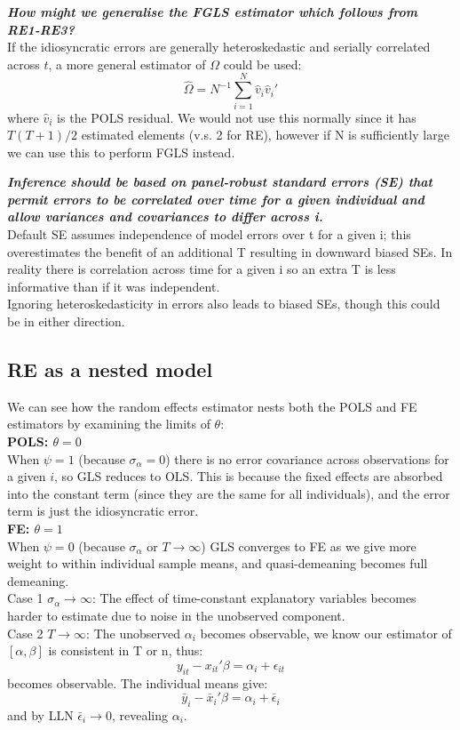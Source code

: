 \documentclass[DIV=14,titlepage=false]{scrreprt}
\begin{document}
\begin{explanation}
    \textit{\textbf{How might we generalise the FGLS estimator which follows from RE1-RE3?}}\\
    If the idiosyncratic errors are generally heteroskedastic and serially correlated across $t$, a more general estimator of $\Omega$ could be used: \[
        \hat \Omega = N^{-1}\sum_{i=1}^N \hat v_i \hat v_i'
    \]
    where $\hat v_i$ is the POLS residual. We would not use this normally since it has $T(T+1)/2$ estimated elements (v.s. 2 for RE), however if N is sufficiently large we can use this to perform FGLS instead.
    \end{explanation}
    \begin{explanation}
        \textit{\textbf{Inference should be based on panel-robust standard errors (SE) that permit errors to be correlated over time for a given individual and allow variances and covariances to differ across i.}}\\
        Default SE assumes independence of model errors over t for a given i; this overestimates the benefit of an additional T resulting in downward biased SEs. In reality there is correlation across time for a given i so an extra T is less informative than if it was independent.\\
        Ignoring heteroskedasticity in errors also leads to biased SEs, though this could be in either direction.
        \end{explanation}
\subsection{RE as a nested model}
We can see how the random effects estimator nests both the POLS and FE estimators by examining the limits of $\theta$:\\
\textbf{POLS: $\theta = 0$}\\
When $\psi = 1$ (because $\sigma_{\alpha} = 0$) there is no error covariance across observations for a given $i$, so GLS reduces to OLS. This is because the fixed effects are absorbed into the constant term (since they are the same for all individuals), and the error term is just the idiosyncratic error.\\
\textbf{FE: $\theta = 1$}\\
When $\psi = 0$ (because $\sigma_\alpha$ or $T \to \infty$) GLS converges to FE as we give more weight to within individual sample means, and quasi-demeaning becomes full demeaning.\\
Case 1 $\mathit{\sigma_{\alpha} \to \infty}$: The effect of time-constant explanatory variables becomes harder to estimate due to noise in the unobserved component. \\
Case 2 $\mathit{T \to \infty}$: The unobserved $\alpha_{i}$ becomes observable, we know our estimator of $[\alpha, \beta]$ is consistent in T or n, thus:
\[
   y_{it} - x_{it}'\beta = \alpha_i + \epsilon_{it}  
\] becomes observable. The individual means give:
\[
    \bar y_i - \bar x_i'\beta = \alpha_i + \bar \epsilon_i
\]
and by LLN $\bar \epsilon_i \to 0$, revealing $\alpha_i$.\\
\end{document}
